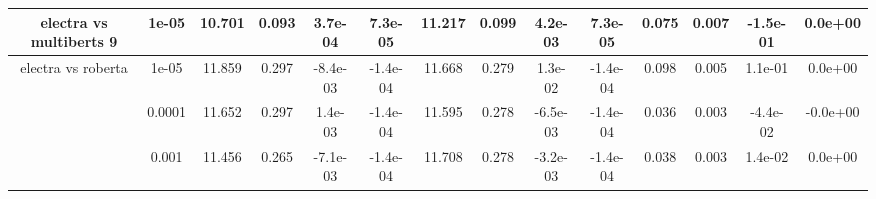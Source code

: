 \begin{tabular}{|c|c|c|c|c|c|c|c|c|c|c|c|c|c|}
\hline
\multirow{1}{*}{electra  vs multiberts 9} & 1e-05 & 10.701 & 0.093 & 3.7e-04 & 7.3e-05 & 11.217 & 0.099 & 4.2e-03 & 7.3e-05 & 0.075 & 0.007 & -1.5e-01 & 0.0e+00 \\
\hline
\multirow{3}{*}{electra  vs roberta } & 1e-05 & 11.859 & 0.297 & -8.4e-03 & -1.4e-04 & 11.668 & 0.279 & 1.3e-02 & -1.4e-04 & 0.098 & 0.005 & 1.1e-01 & 0.0e+00 \\
 & 0.0001 & 11.652 & 0.297 & 1.4e-03 & -1.4e-04 & 11.595 & 0.278 & -6.5e-03 & -1.4e-04 & 0.036 & 0.003 & -4.4e-02 & -0.0e+00 \\
 & 0.001 & 11.456 & 0.265 & -7.1e-03 & -1.4e-04 & 11.708 & 0.278 & -3.2e-03 & -1.4e-04 & 0.038 & 0.003 & 1.4e-02 & 0.0e+00 \\
\hline
\end{tabular}